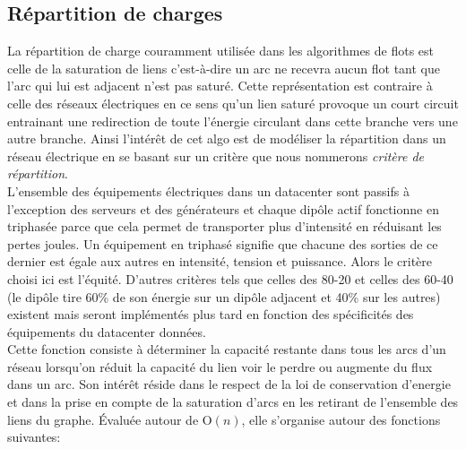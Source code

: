 \documentclass[onecolumn, 12pt]{article}
\begin{document}
\subsection{R\'epartition de charges}
La r\'epartition de charge couramment utilis\'ee dans les algorithmes de flots est celle de la saturation de liens c'est-\`a-dire un arc  ne recevra aucun flot tant que l'arc qui lui est adjacent n'est pas satur\'e. Cette repr\'esentation est contraire \`a celle des r\'eseaux \'electriques en ce sens qu'un lien satur\'e provoque un court circuit entrainant une redirection de toute l'\'energie circulant dans cette branche vers une autre branche. Ainsi l'int\'er\^et de cet algo est de mod\'eliser la r\'epartition dans un r\'eseau \'electrique en se basant sur un crit\`ere que nous nommerons \emph{crit\`ere de r\'epartition}. \\
 L'ensemble des \'equipements \'electriques dans un datacenter sont passifs \`a l'exception des serveurs et des g\'en\'erateurs et chaque dip\^ole actif fonctionne en triphas\'ee parce que cela permet de transporter plus d'intensit\'e en r\'eduisant les pertes joules. Un \'equipement en triphas\'e signifie que chacune des sorties de ce dernier est \'egale aux autres en intensit\'e, tension et puissance. Alors le crit\`ere choisi ici est l'\'equit\'e. D'autres crit\`eres tels que celles des 80-20 et celles des 60-40 (le dip\^ole tire 60\% de son \'energie sur un dip\^ole adjacent et 40\% sur les autres) existent mais seront impl\'ement\'es plus tard en fonction des sp\'ecificit\'es des \'equipements du datacenter donn\'ees.\\
Cette fonction consiste \`a d\'eterminer la capacit\'e restante dans tous les arcs d'un r\'eseau lorsqu'on r\'eduit la capacit\'e du lien voir le perdre ou augmente du flux dans un arc. Son int\'er\^et r\'eside dans le respect de la loi de conservation d'energie et  dans la prise en compte de la saturation d'arcs en les retirant de l'ensemble des liens du graphe. \'Evalu\'ee autour de $\mathrm{O}{(n)}$, elle s'organise autour des fonctions suivantes: 
\end{document}
